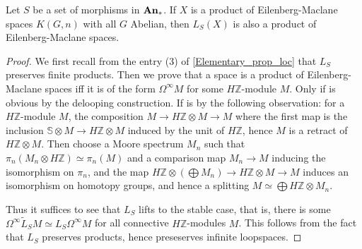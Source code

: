 	\begin{lemma}\label{Loc_prod_EM_space}
		Let $S$ be a set of morphisms in $\mathbf{An}_*$. If $X$ is a product of Eilenberg-Maclane spaces $K(G,n)$ with all $G$ Abelian, then $L_S(X)$ is also a product of Eilenberg-Maclane spaces. 
	\end{lemma}
	\begin{proof}
		We first recall from the entry (3) of \cref{Elementary_prop_loc} that $L_S$ preserves finite products. Then we prove that a space is a product of Eilenberg-Maclane spaces iff it is of the form $\Omega^\infty M$ for some $H\mathbb{Z}$-module $M$. Only if is obvious by the delooping construction. If is by the following observation: for a $H\mathbb{Z}$-module $M$, the composition $M\to H\mathbb{Z}\otimes M\to M$ where the first map is the inclusion $\mathbb{S}\otimes M\to H\mathbb{Z}\otimes M$ induced by the unit of $H\mathbb{Z}$, hence $M$ is a retract of $H\mathbb{Z}\otimes M$. Then choose a Moore spectrum $M_n$ such that $\pi_n(M_n\otimes H\mathbb{Z})\simeq\pi_n(M)$ and a comparison map $M_n\to M$ inducing the isomorphism on $\pi_n$, and the map $H\mathbb{Z}\otimes(\bigoplus M_n)\to H\mathbb{Z}\otimes M\to M$ induces an isomorphism on homotopy groups, and hence a splitting $M\simeq\bigoplus H\mathbb{Z}\otimes M_n$. 

		Thus it suffices to see that $L_S$ lifts to the stable case, that is, there is some $\Omega^\infty\tilde{L}_SM\simeq L_S\Omega^\infty M$ for all connective $H\mathbb{Z}$-modules $M$. This follows from the fact that $L_S$ preserves products, hence preseserves infinite loopspaces. 
	\end{proof}

